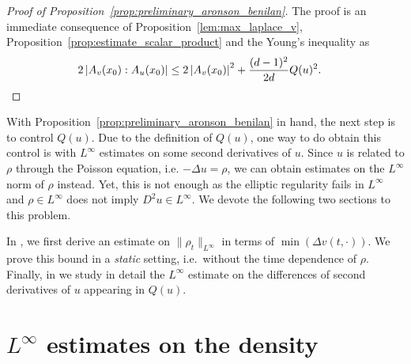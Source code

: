 \documentclass[11pt,a4paper]{article}
\numberwithin{equation}{section}
\theoremstyle{plain}
\theoremstyle{remark}
\newcommand {\f}{\frac}
\begin{document}
\begin{proof}[Proof of Proposition~\ref{prop:preliminary_aronson_benilan}]
The proof is an immediate consequence of Proposition~\ref{lem:max_laplace_v},    Proposition~\ref{prop:estimate_scalar_product} and the Young's inequality as
\begin{align*}
2\left|A_v(x_0):A_u(x_0)\right| &\le  2 \left|A_v(x_0)\right|^2 + \f{(d-1)^2}{2d}Q(u)^2.\qedhere
\end{align*}
\end{proof}
 
 
 With Proposition~\ref{prop:preliminary_aronson_benilan} in hand, the next step is to control $Q(u)$. Due to the definition of $Q(u)$, one way to do obtain this control is with $L^\infty$ estimates on some second derivatives of $u$. Since $u$ is related to $\rho$ through the Poisson equation, i.e. $-\Delta u=\rho$, we can obtain estimates on the $L^\infty$ norm of $\rho$ instead. Yet, this is not enough as the elliptic regularity fails in $L^\infty$ and $\rho\in L^\infty$ does not imply $D^2u\in L^\infty$. We devote the following two sections to this problem.

In , we first derive an estimate on $\|\rho_t\|_{L^\infty}$ in terms of $\min(\Delta v(t,\cdot))$. We prove this bound in a \emph{static} setting, i.e.\ without the time dependence of $\rho$. Finally, in  we study in detail the $L^\infty$ estimate on the differences of second derivatives of $u$ appearing in $Q(u)$.
 

\section{\texorpdfstring{$L^{\infty}$}{Linfty} estimates on the density}\label{sec:Linfty}
\end{document}

